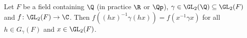 Let $F$ be a field containing $\Q$ (in practice $\R$ or $\Qp$), $\gamma\in\GL_2(\Q)\subseteq\GL_2(F)$ and $f\colon\GL_2(F)\to\C$. Then
$f((hx)^{-1}\gamma(hx))=f(x^{-1}\gamma x)$ for all $h\in G_\gamma(F)$ and $x\in\GL_2(F)$.

